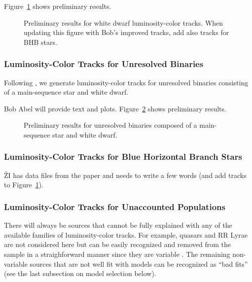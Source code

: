 Figure~\ref{fig:locusWDs} shows preliminary results.


\begin{figure}[ht!]
\caption{Preliminary results for white dwarf luminosity-color
  tracks. When updating this figure with Bob's improved tracks, add also tracks for BHB stars. }
\label{fig:locusWDs}
\end{figure}


\subsubsection{Luminosity-Color Tracks for Unresolved Binaries}

Following \cite{2004ApJ...615L.141S}, we generate luminosity-color tracks for unresolved binaries
consisting of a main-sequence star and white dwarf.

Bob Abel will provide text and plots. Figure~\ref{fig:locusBinaries}
shows preliminary results. 

\begin{figure}[ht!]
\caption{Preliminary results for unresolved binaries composed of a main-sequence star and white dwarf.}
\label{fig:locusBinaries}
\end{figure}



\subsubsection{Luminosity-Color Tracks for Blue Horizontal Branch Stars}

\v{Z}I has data files from the \cite{2004AJ....127..899S} paper and needs to write a few words
(and add tracks to Figure~\ref{fig:locusWDs}). 




\subsubsection{Luminosity-Color Tracks for Unaccounted Populations}

There will always be sources that cannot be fully explained with any of the available families of
luminosity-color tracks. For example, quasars and RR Lyrae are not considered here
but can be easily recognized and removed from the sample in a straighforward manner since
they are variable \citep[e.g., see][]{2007AJ....134.2236S}. The remaining non-variable sources
that are not well fit with models can be recognized as ``bad fits'' (see the last subsection on
model selection below). 

